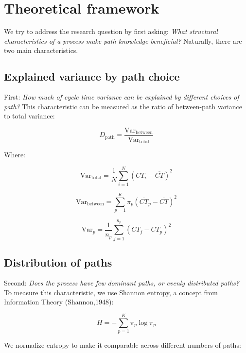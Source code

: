 \documentclass[
]{ceurart}
\begin{document}
\section{Theoretical framework}

We try to address the research question by first asking: \textit{What structural characteristics of a process make path knowledge beneficial?} Naturally, there are two main characteristics.

\subsection{Explained variance by path choice}

First: \textit{How much of cycle time variance can be explained by different choices of path?} This characteristic can be measured as the ratio of between-path variance to total variance:

\begin{equation}
D_{\text{path}} = \frac{\mathrm{Var}_{\text{between}}}{\mathrm{Var}_{\text{total}}}
\end{equation}

Where:

\begin{equation}
\mathrm{Var}_{\text{total}} = \frac{1}{N} \sum_{i=1}^{N} (CT_i - \overline{CT})^2
\end{equation}

\begin{equation}
\mathrm{Var}_{\text{between}} = \sum_{p=1}^{K} \pi_p (\overline{CT}_p - \overline{CT})^2
\end{equation}

\begin{equation}
\mathrm{Var}_p = \frac{1}{n_p} \sum_{j=1}^{n_p} (CT_j - \overline{CT}_p)^2
\end{equation}

\subsection{Distribution of paths}

Second: \textit{Does the process have few dominant paths, or evenly distributed paths?} To measure this characteristic, we use Shannon entropy, a concept from Information Theory (Shannon,1948):

\begin{equation}
H = - \sum_{p=1}^{K} \pi_p \log \pi_p
\end{equation}

We normalize entropy to make it comparable across different numbers of paths:
\end{document}
